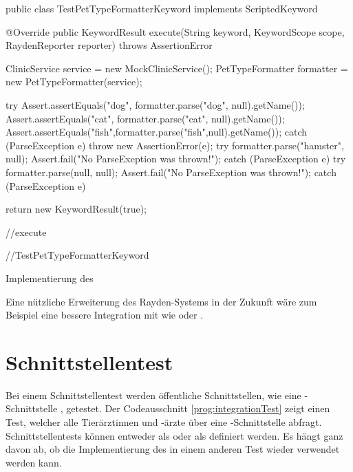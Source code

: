 \begin{program}
\begin{JavaCode}
public class TestPetTypeFormatterKeyword implements ScriptedKeyword {

  @Override
  public KeywordResult execute(String keyword, KeywordScope scope, 
	  RaydenReporter reporter) throws  AssertionError {
    ClinicService service = new MockClinicService();
    PetTypeFormatter formatter = new PetTypeFormatter(service);

    try {
     Assert.assertEquals("dog", formatter.parse("dog", null).getName());
     Assert.assertEquals("cat", formatter.parse("cat", null).getName());
     Assert.assertEquals("fish",formatter.parse("fish",null).getName());
    } catch (ParseException e) {
      throw new AssertionError(e);
    }
    try {
      formatter.parse("hamster", null);
      Assert.fail("No ParseExeption was thrown!");
    } catch (ParseException e) {
    }
    try {
      formatter.parse(null, null);
      Assert.fail("No ParseExeption was thrown!");
    } catch (ParseException e) {
    }

    return new KeywordResult(true);
  } //execute
	
} //TestPetTypeFormatterKeyword
\end{JavaCode}
\caption{Implementierung des  }
\label{prog:unitTestImpl}
\end{program}

\SuperPar
Eine nützliche Erweiterung des Rayden-Systems in der Zukunft wäre zum Beispiel eine bessere Integration mit  wie  oder .

\section{Schnittstellentest}
\label{cha:TestenApi}

Bei einem Schnittstellentest werden öffentliche Schnittstellen, wie eine -Schnittstelle \cite{Rest}, getestet. Der Codeausschnitt \ref{prog:integrationTest} zeigt einen Test, welcher alle Tierärztinnen und -ärzte über eine -Schnittstelle abfragt. Schnittstellentests können entweder als  oder als  definiert werden. Es hängt ganz davon ab, ob die Implementierung des  in einem anderen Test wieder verwendet werden kann. 

